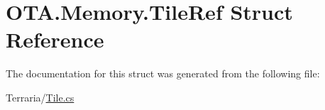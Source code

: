 \hypertarget{struct_o_t_a_1_1_memory_1_1_tile_ref}{}\section{O\+T\+A.\+Memory.\+Tile\+Ref Struct Reference}
\label{struct_o_t_a_1_1_memory_1_1_tile_ref}


The documentation for this struct was generated from the following file\+:\begin{DoxyCompactItemize}
\item 
Terraria/\hyperlink{_tile_8cs}{Tile.\+cs}\end{DoxyCompactItemize}
